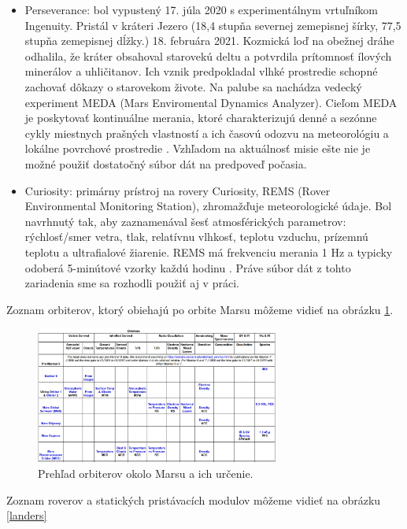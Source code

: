 \begin{itemize}
    \item Perseverance: bol vypustený 17. júla 2020 s experimentálnym vrtuľníkom Ingenuity. Pristál v kráteri Jezero (18,4 stupňa severnej zemepisnej šírky, 77,5 stupňa zemepisnej dĺžky.) 18. februára 2021. Kozmická loď na obežnej dráhe odhalila, že kráter obsahoval starovekú deltu a potvrdila prítomnosť ílových minerálov a uhličitanov. Ich vznik predpokladal vlhké prostredie schopné zachovať dôkazy o starovekom živote. Na palube sa nachádza vedecký experiment MEDA (Mars Enviromental Dynamics Analyzer). Cieľom MEDA je poskytovať kontinuálne merania, ktoré charakterizujú denné a sezónne cykly miestnych prašných vlastností a ich časovú odozvu na meteorológiu a lokálne povrchové prostredie \cite{perseverance}. Vzhľadom na aktuálnosť misie ešte nie je možné použiť dostatočný súbor dát na predpoveď počasia. 
    \item Curiosity: primárny prístroj na rovery Curiosity, REMS (Rover Environmental Monitoring Station), zhromažďuje meteorologické údaje. Bol navrhnutý tak, aby zaznamenával šesť atmosférických parametrov: rýchlosť/smer vetra, tlak, relatívnu vlhkosť, teplotu vzduchu, prízemnú teplotu a ultrafialové žiarenie. REMS má frekvenciu merania 1 Hz a typicky odoberá 5-minútové vzorky každú hodinu \cite{curiosity}. Práve súbor dát z tohto zariadenia sme sa rozhodli použiť aj v práci.
\end{itemize}

Zoznam orbiterov, ktorý obiehajú po orbite Marsu môžeme vidieť na obrázku \ref{orbiters}.

\begin{figure}[!htbp]
  \centering
  \includegraphics[width=8cm]{img/orbiters.png}
  \caption{Prehľad orbiterov okolo Marsu a ich určenie.}
  \label{orbiters}
\end{figure}
\newpage

Zoznam roverov a statických pristávacích modulov môžeme vidieť na obrázku \ref{landers}

